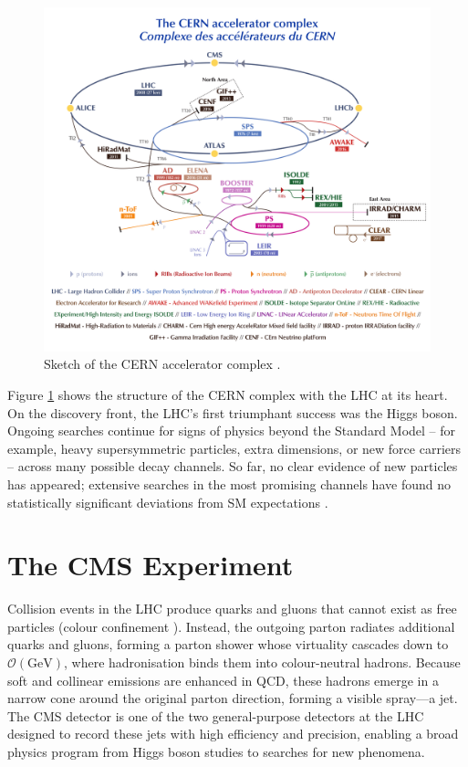 \begin{figure}[h]
    \centering
    \includegraphics[width=0.9\linewidth]{media/CCC-v2018-print-v2.pdf}
    \caption{ Sketch of the CERN accelerator complex \cite{Mobs:2636343}.}
    \label{fig:lhc}
\end{figure}

Figure \ref{fig:lhc} shows the structure of the CERN complex with the LHC at its heart. On the discovery front, the LHC’s first triumphant success was the Higgs boson. Ongoing searches continue for signs of physics beyond the Standard Model – for example, heavy supersymmetric particles, extra dimensions, or new force carriers – across many possible decay channels. So far, no clear evidence of new particles has appeared; extensive searches in the most promising channels have found no statistically significant deviations from SM expectations \cite{sonneveld2025susyhighlightscurrentresults}.

\section{The CMS Experiment}

Collision events in the LHC produce quarks and gluons that cannot exist as free particles (colour confinement \cite{pich2012standardmodelelectroweakinteractions}). Instead, the outgoing parton radiates additional quarks and gluons, forming a parton shower whose virtuality cascades down to $\mathcal{O}(\mathrm{GeV})$, where hadronisation binds them into colour-neutral hadrons. Because soft and collinear emissions are enhanced in QCD, these hadrons emerge in a narrow cone around the original parton direction, forming a visible spray—a jet. The CMS detector is one of the two general-purpose detectors at the LHC designed to record these jets with high efficiency and precision, enabling a broad physics program from Higgs boson studies to searches for new phenomena. 

